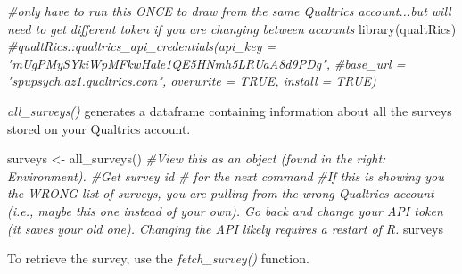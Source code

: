 \documentclass[
  english,
]{book}
\newenvironment{Shaded}{\begin{snugshade}}{\end{snugshade}}
\newcommand{\CommentTok}[1]{\textcolor[rgb]{0.56,0.35,0.01}{\textit{#1}}}
\newcommand{\FunctionTok}[1]{\textcolor[rgb]{0.00,0.00,0.00}{#1}}
\newcommand{\NormalTok}[1]{#1}
\newcommand{\OtherTok}[1]{\textcolor[rgb]{0.56,0.35,0.01}{#1}}
\begin{document}
\begin{Shaded}
\begin{Highlighting}[]
\CommentTok{\#only have to run this ONCE to draw from the same Qualtrics account...but will need to get different token if you are changing between accounts }
\FunctionTok{library}\NormalTok{(qualtRics)}
\CommentTok{\#qualtRics::qualtrics\_api\_credentials(api\_key = "mUgPMySYkiWpMFkwHale1QE5HNmh5LRUaA8d9PDg",}
              \CommentTok{\#base\_url = "spupsych.az1.qualtrics.com", overwrite = TRUE, install = TRUE)}
\end{Highlighting}
\end{Shaded}

\emph{all\_surveys()} generates a dataframe containing information about all the surveys stored on your Qualtrics account.

\begin{Shaded}
\begin{Highlighting}[]
\NormalTok{surveys }\OtherTok{\textless{}{-}} \FunctionTok{all\_surveys}\NormalTok{() }
\CommentTok{\#View this as an object (found in the right: Environment).  }
\CommentTok{\#Get survey id \# for the next command}
\CommentTok{\#If this is showing you the WRONG list of surveys, you are pulling from the wrong Qualtrics account (i.e., maybe this one instead of your own). Go back and change your API token (it saves your old one). Changing the API likely requires a restart of R.}
\NormalTok{surveys}
\end{Highlighting}
\end{Shaded}

To retrieve the survey, use the \emph{fetch\_survey()} function.
\end{document}
